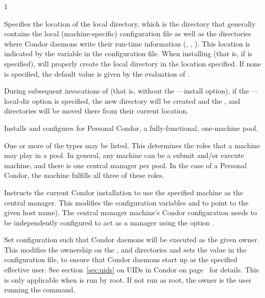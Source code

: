 \begin{ManPage}{\label{man-condor-configure}}{1}
\begin{Options}
   {Specifies the
    location of the local directory, which is the directory that generally 
    contains the local (machine-specific) configuration file as well as the
    directories where Condor daemons write their run-time information 
    (, , ).
    This location is indicated  by the  
    variable in the configuration file. 
    When installing (that is, if  is specified),
    will properly create the local directory in the location specified.
    If none is specified, the default value is given by the evaluation of
    .

    During subsequent invocations of 
    (that is, without the ---install option),
    if the ---local-dir option is specified, the new directory
    will be created and the ,  and  
    directories will be moved there from their current location.}

   {Installs and configures for 
     Personal Condor, a fully-functional, one-machine pool.}

   {One
    or more of the types may be listed.
    This determines the roles that a machine may play in a pool.
    In general, any machine can be a submit and/or execute machine,
    and there is one central manager per pool.
    In the case of a Personal Condor,
    the machine fulfills all three of these roles.}

   {Instructs
    the current Condor installation to use the specified machine
    as the central manager. 
    This modifies the configuration variables 
    and  to point to the given host name).
    The central manager machine's Condor configuration needs
    to be independently configured to 
    act as a manager using the option . }

   {Set configuration
    such that Condor daemons will be executed as the given owner.
    This modifies the 
    ownership on the ,  and 
    directories and sets the  value
    in the configuration file,
    to ensure that Condor daemons start up as the specified effective user.
    See section~\ref{sec:uids} on
    UIDs in Condor on page~\pageref{sec:uids} for details.
    This is only applicable when  is run by root.
    If not run as root, the owner is the user running
    the  command.  }


\end{Options}
\end{ManPage}
